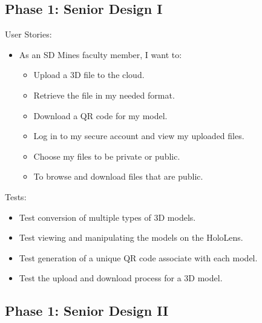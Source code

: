 
\subsection{Phase 1: Senior Design I}

User Stories:
\begin{itemize}
	\item As an SD Mines faculty member, I want to:
		\begin{itemize}
			\item Upload a 3D file to the cloud.
			\item Retrieve the file in my needed format.
			\item Download a QR code for my model.
			\item Log in to my secure account and view my uploaded files.
			\item Choose my files to be private or public.
			\item To browse and download files that are public.
		\end{itemize}
\end{itemize}
Tests:
\begin{itemize}
	\item Test conversion of multiple types of 3D models.
	\item Test viewing and manipulating the models on the HoloLens.
	\item Test generation of a unique QR code associate with each model.
	\item Test the upload and download process for a 3D model.
\end{itemize}

\subsection{Phase 1: Senior Design II}


